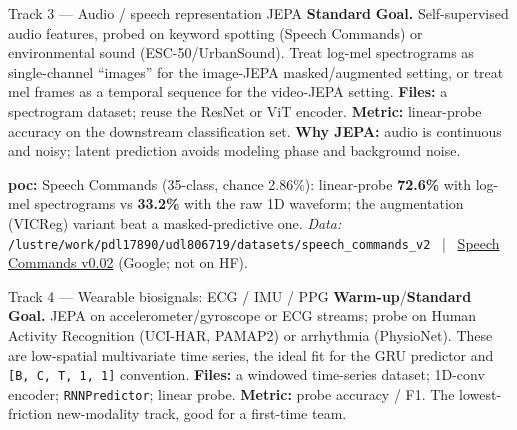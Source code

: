 \documentclass{article}
\newcommand{\code}[1]{\texttt{\small #1}}
\newcommand{\diffeasy}{\colorbox{ebgreen!18}{\textcolor{ebgreen}{\small\bfseries Warm-up}}}
\newcommand{\diffmed}{\colorbox{ebamber!18}{\textcolor{ebamber}{\small\bfseries Standard}}}
\begin{document}
\begin{trackbox}{Track 3 --- Audio / speech representation JEPA \hfill \diffmed{}}
\textbf{Goal.} Self-supervised audio features, probed on keyword spotting (Speech
Commands) or environmental sound (ESC-50/UrbanSound). Treat log-mel spectrograms as
single-channel ``images'' for the image-JEPA masked/augmented setting, or treat mel
frames as a temporal sequence for the video-JEPA setting. \textbf{Files:} a
spectrogram dataset; reuse the ResNet or ViT encoder. \textbf{Metric:} linear-probe
accuracy on the downstream classification set. \textbf{Why JEPA:} audio is
continuous and noisy; latent prediction avoids modeling phase and background noise.

\smallskip
\textbf{poc:} Speech Commands (35-class, chance 2.86\%): linear-probe \textbf{72.6\%}
with log-mel spectrograms vs \textbf{33.2\%} with the raw 1D waveform; the
augmentation (VICReg) variant beat a masked-predictive one.
\emph{Data:} \code{/lustre/work/pdl17890/udl806719/datasets/speech\_commands\_v2} ~|~
\href{http://download.tensorflow.org/data/speech_commands_v0.02.tar.gz}{Speech Commands v0.02}
(Google; not on HF).
\end{trackbox}

\begin{trackbox}{Track 4 --- Wearable biosignals: ECG / IMU / PPG \hfill \diffeasy{}/\diffmed{}}
\textbf{Goal.} JEPA on accelerometer/gyroscope or ECG streams; probe on Human
Activity Recognition (UCI-HAR, PAMAP2) or arrhythmia (PhysioNet). These are
low-spatial multivariate time series, the ideal fit for the GRU predictor and
\code{[B, C, T, 1, 1]} convention. \textbf{Files:} a windowed time-series dataset;
1D-conv encoder; \code{RNNPredictor}; linear probe. \textbf{Metric:} probe accuracy
/ F1. The lowest-friction new-modality track, good for a first-time team.
\end{trackbox}
\end{document}
